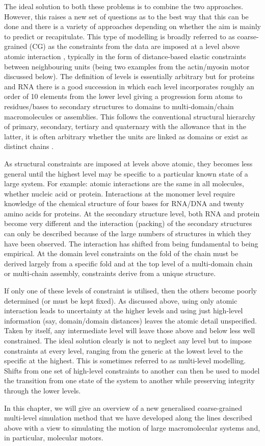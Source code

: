 The ideal solution to both these problems is to combine the two approaches.
However, this raises a new set of questions as to the best way that this
can be done and there is a variety of approaches depending on whether the
aim is mainly to predict or recapitulate.   This type of modelling is broadly
referred to as coarse-grained (CG) as the constraints from the data are
imposed at a level above atomic interaction \cite{IzvekovSet05,ZhangZet09,TaylorWRet10a},  
typically in the form of distance-based elastic constraints between neighbouring
units \cite{ParkerDet09,ZhengW11} (being two examples from the actin/myosin motor discussed below).
The definition of levels is essentially arbitrary but for proteins and RNA there is a good
succession in which each level incorporates roughly an order of 10 elements
from the lower level giving a progression form atoms to residues/bases to
secondary structures to domains to multi-domain/chain macromolecules or
assemblies.   This follows the conventional structural hierarchy of
primary, secondary, tertiary and quaternary with the allowance that in the
latter, it is often arbitrary whether the units are linked as domains or
exist as distinct chains \cite{TaylorWRet05}.

As structural constraints are imposed 
at levels above atomic, they becomes less general until the highest
level may be specific to a particular known state of a large system.
For example:  atomic interactions are the same in all molecules, whether
nucleic acid or protein.  Interactions at the monomer level require 
knowledge of the chemical structure of four bases for RNA/DNA and twenty
amino acids for proteins.  At the secondary structure level, both RNA
and protein become very different and the interaction (packing) of the
secondary structures can only be described because of the large numbers
of structures in which they have been observed.  The interaction has
shifted from being fundamental to being empirical.  At the domain level
constraints on the fold of the chain must be derived largely from a
specific fold and at the top level of a multi-domain chain or multi-chain
assembly, constraints derive from a unique structure.

If only one of these levels of constraint is utilised, then the others 
become poorly determined (or must be kept fixed).  As discussed above, using only atomic 
interaction leads to uncertainty at the higher levels and using just 
high-level information (say, domain/domain distances) leaves the
atomic detail unspecified.  Taken by itself, any intermediate level
will leave those above and below less well constrained.  The ideal solution
clearly is not to neglect any level but to impose constraints at every
level, ranging from the generic at the lowest level to the specific at the highest.  
This is sometimes referred to as multi-level modelling.
Shifts from one set of high-level constraints to
another can then be used to model the transition from one state of the
system to another while preserving integrity through the lower levels.

In this chapter, we will give an overview of a new generalised coarse-grained
multi-level simulation method that we have developed along the lines
described above with a view to simulating the motion of large macromolecular
systems and, in particular, molecular motors.   
